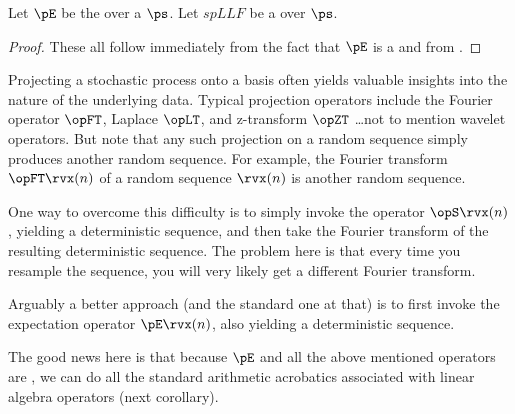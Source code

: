 \begin{corollary}
\label{cor:pE_linop}
Let $\pE$ be the  over a  $\ps$.
Let $spLLF$ be a  over $\ps$.
\end{corollary}
\begin{proof}
These all follow immediately from the fact that $\pE$ is a  
and from .
\end{proof}

\begin{remark}
Projecting a stochastic process onto a basis often yields valuable insights 
into the nature of the underlying data. 
Typical projection operators include the Fourier operator $\opFT$, Laplace $\opLT$,
and z-transform $\opZT$ \ldots not to mention wavelet operators.
But note that any such projection on a random sequence simply produces another random sequence.
For example, the Fourier transform $\opFT\rvx(n)$ of a random sequence $\rvx(n)$ is another random 
sequence.

One way to overcome this difficulty is to simply invoke the  operator $\opS\rvx(n)$ ,
yielding a deterministic sequence, and then take the Fourier transform of the resulting 
deterministic sequence. 
The problem here is that every time you resample the sequence, you will very likely get a 
different Fourier transform.

Arguably a better approach (and the standard one at that) 
is to first invoke the expectation operator $\pE\rvx(n)$, also yielding a deterministic sequence.

The good news here is that because $\pE$ and all the above mentioned operators are , 
we can do all the standard arithmetic acrobatics associated with linear algebra operators (next corollary).
\end{remark}

